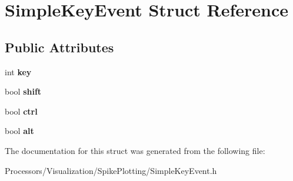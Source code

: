 \hypertarget{structSimpleKeyEvent}{\section{Simple\-Key\-Event Struct Reference}
\label{structSimpleKeyEvent}
}
\subsection*{Public Attributes}
\begin{DoxyCompactItemize}
\item 
\hypertarget{structSimpleKeyEvent_ac3f519a65f1b8bc757ca8560a3c1a4f0}{int {\bfseries key}}\label{structSimpleKeyEvent_ac3f519a65f1b8bc757ca8560a3c1a4f0}

\item 
\hypertarget{structSimpleKeyEvent_adf840a9b2662f5e709ee40e245e988ad}{bool {\bfseries shift}}\label{structSimpleKeyEvent_adf840a9b2662f5e709ee40e245e988ad}

\item 
\hypertarget{structSimpleKeyEvent_a594a56922b5f00a178d7abb76ae43c02}{bool {\bfseries ctrl}}\label{structSimpleKeyEvent_a594a56922b5f00a178d7abb76ae43c02}

\item 
\hypertarget{structSimpleKeyEvent_aec2639c73f1ee6fff8f894ccd6454a3f}{bool {\bfseries alt}}\label{structSimpleKeyEvent_aec2639c73f1ee6fff8f894ccd6454a3f}

\end{DoxyCompactItemize}


The documentation for this struct was generated from the following file\-:\begin{DoxyCompactItemize}
\item 
Processors/\-Visualization/\-Spike\-Plotting/Simple\-Key\-Event.\-h\end{DoxyCompactItemize}
